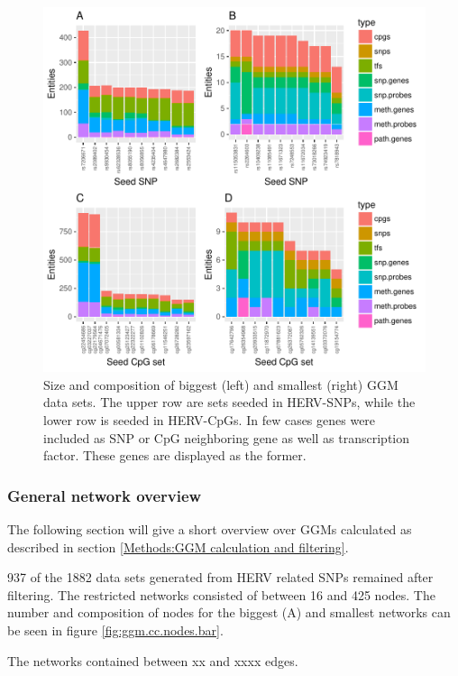 \documentclass[a4paper,12pt,twoside,openright]{article}
\begin{document}
\begin{figure}[tb]
	\includegraphics[scale = 1, keepaspectratio = true]{../figures/hervS2_ggm_data_entity_bar}  
	\caption{Size and composition of biggest (left) and smallest (right) GGM data sets. The upper row are sets seeded in HERV-SNPs, while the lower row is seeded in HERV-CpGs. In few cases genes were included as SNP or CpG neighboring gene as well as transcription factor. These genes are displayed as the former.}
    \label{fig:ggm.data.entity.bar}
\end{figure}


\subsubsection{General network overview}
\label{Results:General network overview}
The following section will give a short overview over GGMs calculated as described in section \ref{Methods:GGM calculation and filtering}. 

937 of the 1882 data sets generated from HERV related SNPs remained after filtering. The restricted networks consisted of between 16 and 425 nodes. The number and composition of nodes for the biggest (A) and smallest networks can be seen in figure \ref{fig:ggm.cc.nodes.bar}.

The networks contained between xx and xxxx edges. 
\end{document}
